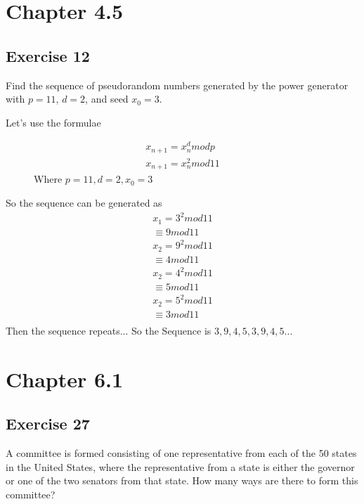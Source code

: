 \documentclass[12pt]{article}
\begin{document}
    \section{Chapter 4.5}
    \subsection{Exercise 12}
    Find the sequence of pseudorandom numbers generated by the power generator with $p = 11$, $d=2$, and seed $x_0=3$.



    Let's use the formulae
    \begin{figure}
      \centering
      \begin{equation}
      \begin{split}
        x_{n+1}=x_n^d mod p\\
        x_{n+1}=x_n^2 mod 1 1
      \end{split}
    \end{equation}
    Where $p=11,d=2, x_0=3$
\end{figure}
  
    So the sequence can be generated as
    \begin{equation}
      \begin{split}
        x_1=3^2mod1 1\\
        \equiv 9 mod 1 1\\
        x_2=9^2mod1 1\\
        \equiv 4 mod 1 1\\
        x_2=4^2mod1 1\\
        \equiv 5 mod 1 1\\
        x_2=5^2mod1 1\\
        \equiv 3 mod 1 1\\
      \end{split}
    \end{equation}
    Then the sequence repeats...
    So the Sequence is $3,9,4,5,3,9,4,5...$

    \section{Chapter 6.1}
    \subsection{Exercise 27}
    A committee is formed consisting of one representative from each of the 50 states in the United States, where the representative from a state is either the governor or one of the two senators from that state. How many ways are there to form this committee?
\end{document}
